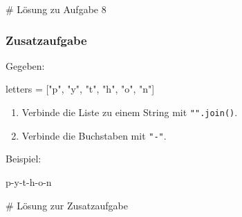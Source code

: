 \documentclass[
  11pt,
  a4paper,
  DIV=11,
  numbers=noendperiod]{scrartcl}
\newenvironment{Shaded}{\begin{snugshade}}{\end{snugshade}}
\newcommand{\CommentTok}[1]{\textcolor[rgb]{0.37,0.37,0.37}{#1}}
\newcommand{\NormalTok}[1]{\textcolor[rgb]{0.00,0.23,0.31}{#1}}
\newcommand{\OperatorTok}[1]{\textcolor[rgb]{0.37,0.37,0.37}{#1}}
\newcommand{\StringTok}[1]{\textcolor[rgb]{0.13,0.47,0.30}{#1}}
\providecommand{\tightlist}{%
  \setlength{\itemsep}{0pt}\setlength{\parskip}{0pt}}
\begin{document}
\begin{Shaded}
\begin{Highlighting}[numbers=left,,]
\CommentTok{\# Lösung zu Aufgabe 8}
\end{Highlighting}
\end{Shaded}

\subsubsection{Zusatzaufgabe}\label{zusatzaufgabe}

Gegeben:

\begin{Shaded}
\begin{Highlighting}[numbers=left,,]
\NormalTok{letters }\OperatorTok{=}\NormalTok{ [}\StringTok{"p"}\NormalTok{, }\StringTok{"y"}\NormalTok{, }\StringTok{"t"}\NormalTok{, }\StringTok{"h"}\NormalTok{, }\StringTok{"o"}\NormalTok{, }\StringTok{"n"}\NormalTok{]}
\end{Highlighting}
\end{Shaded}

\begin{enumerate}
\def\labelenumi{\arabic{enumi}.}
\tightlist
\item
  Verbinde die Liste zu einem String mit \texttt{"".join()}.\\
\item
  Verbinde die Buchstaben mit \texttt{"-"}.
\end{enumerate}

Beispiel:

\begin{Shaded}
\begin{Highlighting}[numbers=left,,]
\NormalTok{p}\OperatorTok{{-}}\NormalTok{y}\OperatorTok{{-}}\NormalTok{t}\OperatorTok{{-}}\NormalTok{h}\OperatorTok{{-}}\NormalTok{o}\OperatorTok{{-}}\NormalTok{n}
\end{Highlighting}
\end{Shaded}

\begin{Shaded}
\begin{Highlighting}[numbers=left,,]
\CommentTok{\# Lösung zur Zusatzaufgabe}
\end{Highlighting}
\end{Shaded}
\end{document}
